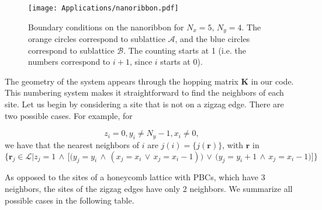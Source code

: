 \begin{figure}[H]\label{fig:bcRibbon}
	\centering
\texttt{[image: Applications/nanoribbon.pdf]}
	\caption[Boundary conditions on the nanoribbon.]{Boundary conditions on the nanoribbon for $N_x = 5, \, N_y = 4$. The orange circles correspond to sublattice $\mathcal{A}$, and the blue circles correspond to sublattice $\mathcal{B}$.
	The counting starts at 1 (i.e. the numbers correspond to $i+1$, since $i$ starts at 0).}
	\label{fig:nanoribbon}
\end{figure}

The geometry of the system appears through the hopping matrix $\bm K$ in our code.
This numbering system makes it straightforward to find the neighbors of each site.
Let us begin by considering a site that is not on a zigzag edge.
There are two possible cases. For example, for 

\begin{equation*}
z_i = 0, y_i \neq N_y - 1, x_i \neq 0 ,
\end{equation*}
we have that the nearest neighbors of $i$ are $ j (i) = \{ j ( \bm r) \}$, with $\bm r$ in
\begin{equation*}
\bigg\{ \bm r_j \in \mathcal{L} \bigg| z_j = 1 \,\land\, \bigg[ \bigg( y_j = y_i  \,\land\, ( x_j = x_i \,\lor\, x_j = x_i - 1) \bigg) \,\lor\, \bigg( y_j = y_i + 1  \,\land\, x_j = x_i - 1  \bigg)  \bigg] \bigg\}
\end{equation*}

As opposed to the sites of a honeycomb lattice with \acp{PBC}, which have 3 neighbors, the sites of the zigzag edges have only 2 neighbors.
We summarize all possible cases in the following table.

